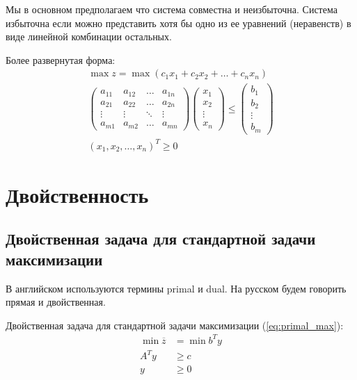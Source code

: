 \documentclass[a4paper,article,14pt]{extarticle}
\begin{document}
Мы в основном предполагаем что система совместна и неизбыточна.
Система избыточна если можно представить хотя бы одно из ее уравнений (неравенств) в виде линейной комбинации остальных.

Более развернутая форма:
\begin{equation}
    \begin{gathered}
        \max z = \max (c_1x_1 + c_2x_2 + \ldots + c_nx_n) \\
        \begin{pmatrix}
            a_{11} & a_{12} & \ldots & a_{1n} \\
            a_{21} & a_{22} & \ldots & a_{2n} \\
            \vdots & \vdots & \ddots & \vdots \\
            a_{m1} & a_{m2} & \ldots & a_{mn}
        \end{pmatrix}
        \begin{pmatrix}
            x_1 \\ x_2 \\ \vdots \\ x_n
        \end{pmatrix}
        \le
        \begin{pmatrix}
            b_1 \\ b_2 \\ \vdots \\ b_m
        \end{pmatrix}
        \\
        (x_1, x_2, \ldots, x_n)^T \ge 0
    \end{gathered}
\end{equation}

\newpage

\section{Двойственность}

\subsection{Двойственная задача для стандартной задачи максимизации}

В английском используются термины primal и dual.
На русском будем говорить прямая и двойственная.

Двойственная задача для стандартной задачи максимизации (\ref{eq:primal_max}):
\begin{equation} \label{dual_max}
    \begin{aligned}
        \min \overline z & = \min b^Ty \\
        A^Ty & \ge c \\
        y & \ge 0
    \end{aligned}
\end{equation}
\end{document}
